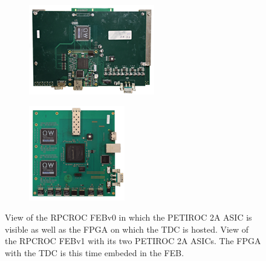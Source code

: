 	\begin{figure}[H]
		\begin{subfigure}{0.5\linewidth}
		    \centering
			\includegraphics[width = 0.8\linewidth]{fig/chapt6/iRPC-RPCROCv0.png}
			\caption{\label{fig:RPCROC_FEB:A}}
		\end{subfigure}
		\begin{subfigure}{0.5\linewidth}
		    \centering
			\includegraphics[width = 0.8\linewidth]{fig/chapt6/iRPC-RPCROCv1.png}
			\caption{\label{fig:RPCROC_FEB:B}}
		\end{subfigure}
		\caption{\label{fig:RPCROC_FEB}  View of the RPCROC FEBv0 in which the PETIROC 2A ASIC is visible as well as the FPGA on which the TDC is hosted.  View of the RPCROC FEBv1 with its two PETIROC 2A ASICs. The FPGA with the TDC is this time embeded in the FEB.}
	\end{figure}
	
